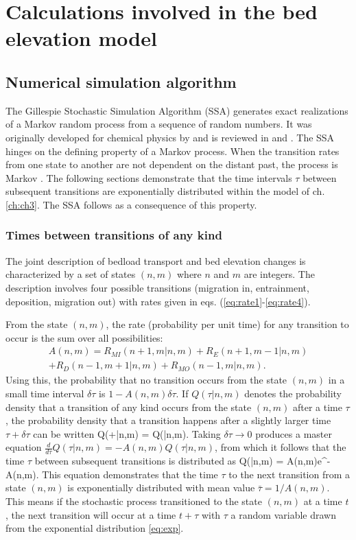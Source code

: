 

\chapter{Calculations involved in the bed elevation model}
\label{ch:gill}
\section{Numerical simulation algorithm}

The Gillespie Stochastic Simulation Algorithm (SSA) generates exact realizations of a Markov random process from a sequence of random numbers.
It was originally developed for chemical physics by \citet{Gillespie1977} and is reviewed in \citet{Gillespie1991} and \citet{Gillespie2007}.
The SSA hinges on the defining property of a Markov process. When the transition rates from one state to another are not dependent on the distant past, the process is Markov \citep{Cox1965}.
The following sections demonstrate that the time intervals $\tau$ between subsequent transitions are exponentially distributed within the model of ch. \ref{ch:ch3}. The SSA follows as a consequence of this property.

\subsection{Times between transitions of any kind}
The joint description of bedload transport and bed elevation changes is characterized by a set of states $(n,m)$ where $n$ and $m$ are integers.
The description involves four possible transitions (migration in, entrainment, deposition, migration out) with rates given in eqs. (\ref{eq:rate1}-\ref{eq:rate4}).

From the state $(n,m)$, the rate (probability per unit time) for any transition to occur is the sum over all possibilities:
\begin{multline} A(n,m) = R_{MI}(n+1,m|n,m) + R_E(n+1,m-1|n,m) \\+ R_D(n-1,m+1|n,m) + R_{MO}(n-1,m|n,m).\end{multline}
Using this, the probability that no transition occurs from the state $(n,m)$ in a small time interval $\delta \tau$ is $1-A(n,m)\delta \tau$. If $Q(\tau|n,m)$ denotes the probability density that a transition of any kind occurs from the state $(n,m)$ after a time $\tau$, the probability density that a transition happens after a slightly larger time $\tau + \delta \tau$ can be written
\be Q(\tau+\delta \tau|n,m) = Q(\tau|n,m).\ee
Taking $\delta\tau \rightarrow 0 $ produces a master equation $\frac{d}{d\tau}Q(\tau|n,m) = -A(n,m)Q(\tau|n,m)$, from which it follows that the time $\tau$ between subsequent transitions is distributed as 
\be Q(\tau|n,m) = A(n,m)e^{-A(n,m)\tau}. \label{eq:exp}\ee
This equation demonstrates that the time $\tau$ to the next transition from a state $(n,m)$ is exponentially distributed with mean value $\bar{\tau} = 1/A(n,m).$ This means if the stochastic process transitioned to the state $(n,m)$ at a time $t$, the next transition will occur at a time $t+\tau$ with $\tau$ a random variable drawn from the exponential distribution \ref{eq:exp}.

